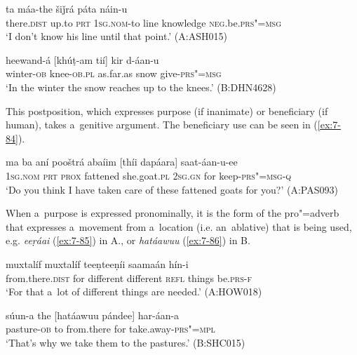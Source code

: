 \begin{exe}
\ex
\label{ex:7-82}
 ta máa-the šiǰrá páta náin-u \\
there.\textsc{dist} up.to \textsc{prt} \textsc{1sg.nom}-to line knowledge \textsc{neg}.be.\textsc{prs"=msg} \\
\glt `I don't know his line until that point.' (A:ASH015)
\end{exe}
\begin{exe}
\ex
\label{ex:7-83}
\gll heewand-á [khúṭ-am tií] kir d-áan-u \\
winter-\textsc{ob} knee-\textsc{ob.pl} as.far.as snow give-\textsc{prs"=msg}  \\
\glt `In the winter the snow reaches up to the knees.' (B:DHN4628)
\end{exe}

 This postposition, which expresses purpose (if inanimate) or beneficiary (if human), takes a~genitive argument. The beneficiary use can be seen in (\ref{ex:7-84}).

\begin{exe}
\ex
\label{ex:7-84}
\gll ma ba aní pooštrá abaíim [thíi dapáara] saat-áan-u-ee \\
\textsc{1sg.nom} \textsc{prt} \textsc{prox} fattened she.goat.\textsc{pl} \textsc{2sg.gn} for keep-\textsc{prs"=msg-q} \\
\glt `Do you think I have taken care of these fattened goats for you?' (A:PAS093)
\end{exe}

When a~purpose is expressed pronominally, it is the form of the pro"=adverb that expresses a~movement from a~location (i.e. an~ablative) that is being used, e.g. \textit{eeṛáai} (\ref{ex:7-85}) in A., or \textit{hatáawuu} (\ref{ex:7-86}) in B.

\begin{exe}
\ex
\label{ex:7-85}
 muxtalíf muxtalíf teeṇteeṇíi saamaán hín-i \\
from.there.\textsc{dist} for different different \textsc{refl}  things be.\textsc{prs-f}  \\
\glt `For that a~lot of different things are needed.' (A:HOW018)
\end{exe}
\begin{exe}
\ex
\label{ex:7-86}
\gll súun-a the [hatáawuu pándee] har-áan-a \\
pasture-\textsc{ob} to from.there for take.away-\textsc{prs"=mpl} \\
\glt `That's why we take them to the pastures.' (B:SHC015)
\end{exe}

